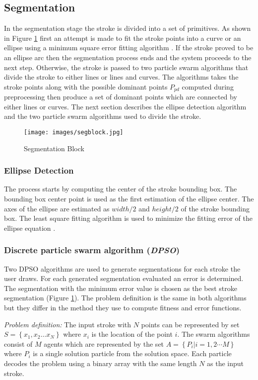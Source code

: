 \documentclass{article}
\begin{document}
\subsection{Segmentation}
\label{seg}
In the segmentation stage the stroke is divided into a set of primitives. As shown in Figure \ref{fig:segblock} first an attempt is made to fit the stroke points into a curve or an ellipse using a minimum square error fitting algorithm \cite{chernov-2003}. If the stroke proved to be an ellipse arc then the segmentation process ends and the system proceeds to the next step. Otherwise, the stroke is passed to two particle swarm algorithms that divide the stroke to either lines or lines and curves. The algorithms takes the stroke points along with the possible dominant points $P_{pd}$ computed during preprocessing then produce a set of dominant points which are connected by either lines or curves. The next section describes the ellipse detection algorithm and the two particle swarm algorithms used to divide the stroke.
 \begin{figure}
	\centering
		\texttt{[image: images/segblock.jpg]}
	\caption{Segmentation Block}
	\label{fig:segblock}
\end{figure}
\subsubsection{Ellipse Detection} 
The process starts by computing the center of the stroke bounding box. The bounding box center point is used as the first estimation of the ellipse center. The axes of the ellipse are estimated as $width/2$ and $height/2$ of the stroke bounding box. The least square fitting algorithm is used to minimize the fitting error of the ellipse equation \cite{chernov-2003}.  
\subsubsection{Discrete particle swarm algorithm (\textit{DPSO})}
\label{subsubsec:Discreteparticleswarmalgorithm}
Two DPSO algorithms are used to generate segmentations for each stroke the user draws. For each generated segmentation evaluated an error is determined. The segmentation with the minimum error value is chosen as the best stroke segmentation (Figure \ref{fig:segblock}). The problem definition is the same in both algorithms but they differ in the method they use to compute fitness and error functions. 

\textsl{Problem definition:} The input stroke with $N$ points can be represented by set $S = \left\{ {x_1 ,x_2  \ldots x_N }\right\}$ where $x_i$ is the location of the point $i$. The swarm algorithms consist of $M$ agents which are represented by the set  $A = \left\{ {P_i \left| {i = 1,2 \cdots M} \right.} \right\}$ where $P_i$ is a single solution particle from the solution space. Each particle decodes the problem using a binary array with the same length $N$ as the input stroke.  
\end{document}
